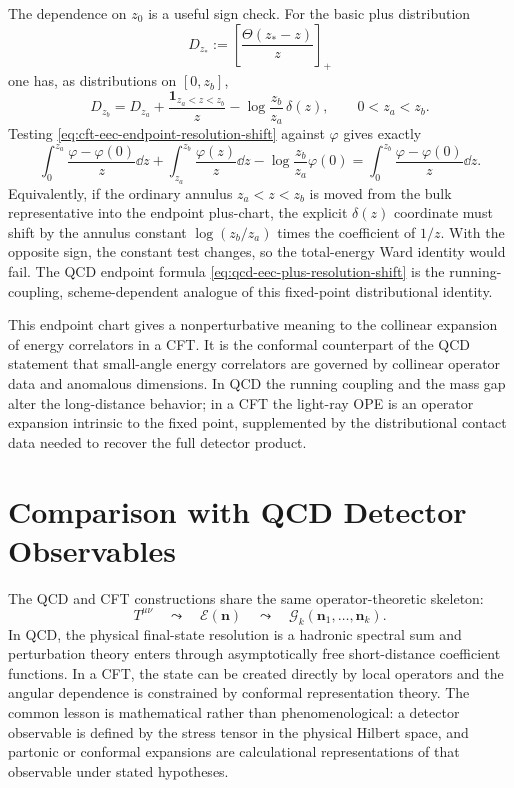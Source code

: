 The dependence on \(z_0\) is a useful sign check.  For the basic plus
distribution
\[
  D_{z_*}:=
  \left[\frac{\Theta(z_*-z)}{z}\right]_{+}
\]
one has, as distributions on \([0,z_b]\),
\begin{equation}
  D_{z_b}
  =
  D_{z_a}
  +
  \frac{\mathbf 1_{z_a<z<z_b}}{z}
  -
  \log\frac{z_b}{z_a}\,\delta(z),
  \qquad 0<z_a<z_b .
  \label{eq:cft-eec-endpoint-resolution-shift}
\end{equation}
Testing \eqref{eq:cft-eec-endpoint-resolution-shift} against \(\varphi\)
gives exactly
\[
  \int_0^{z_a}\frac{\varphi-\varphi(0)}{z}\dd z
  +
  \int_{z_a}^{z_b}\frac{\varphi(z)}{z}\dd z
  -
  \log\frac{z_b}{z_a}\varphi(0)
  =
  \int_0^{z_b}\frac{\varphi-\varphi(0)}{z}\dd z .
\]
Equivalently, if the ordinary annulus \(z_a<z<z_b\) is moved from the bulk
representative into the endpoint plus-chart, the explicit \(\delta(z)\)
coordinate must shift by the annulus constant
\(\log(z_b/z_a)\) times the coefficient of \(1/z\).  With the opposite sign,
the constant test changes, so the total-energy Ward identity would fail.  The
QCD endpoint formula
\eqref{eq:qcd-eec-plus-resolution-shift} is the running-coupling,
scheme-dependent analogue of this fixed-point distributional identity.

This endpoint chart gives a nonperturbative meaning to the collinear
expansion of energy correlators in a CFT.  It is the conformal counterpart of
the QCD statement that small-angle energy correlators are governed by
collinear operator data and anomalous dimensions.  In QCD the running coupling
and the mass gap alter the long-distance behavior; in a CFT the light-ray OPE
is an operator expansion intrinsic to the fixed point, supplemented by the
distributional contact data needed to recover the full detector product.

\section{Comparison with QCD Detector Observables}

The QCD and CFT constructions share the same operator-theoretic skeleton:
\[
  T^{\mu\nu}
  \quad\leadsto\quad
  \mathcal E(\mathbf n)
  \quad\leadsto\quad
  \mathcal G_k(\mathbf n_1,\ldots,\mathbf n_k).
\]
In QCD, the physical final-state resolution is a hadronic spectral sum and
perturbation theory enters through asymptotically free short-distance
coefficient functions.  In a CFT, the state can be created directly by local
operators and the angular dependence is constrained by conformal
representation theory.  The common lesson is mathematical rather than
phenomenological: a detector observable is defined by the stress tensor in the
physical Hilbert space, and partonic or conformal expansions are calculational
representations of that observable under stated hypotheses.
